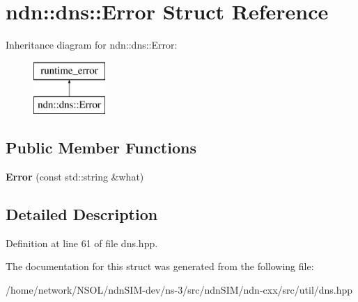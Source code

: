 \hypertarget{structndn_1_1dns_1_1Error}{}\section{ndn\+:\+:dns\+:\+:Error Struct Reference}
\label{structndn_1_1dns_1_1Error}
Inheritance diagram for ndn\+:\+:dns\+:\+:Error\+:\begin{figure}[H]
\begin{center}
\leavevmode
\includegraphics[height=2.000000cm]{structndn_1_1dns_1_1Error}
\end{center}
\end{figure}
\subsection*{Public Member Functions}
\begin{DoxyCompactItemize}
\item 
{\bfseries Error} (const std\+::string \&what)\hypertarget{structndn_1_1dns_1_1Error_a2a69a2063a526a0506529ca2b914d967}{}\label{structndn_1_1dns_1_1Error_a2a69a2063a526a0506529ca2b914d967}

\end{DoxyCompactItemize}


\subsection{Detailed Description}


Definition at line 61 of file dns.\+hpp.



The documentation for this struct was generated from the following file\+:\begin{DoxyCompactItemize}
\item 
/home/network/\+N\+S\+O\+L/ndn\+S\+I\+M-\/dev/ns-\/3/src/ndn\+S\+I\+M/ndn-\/cxx/src/util/dns.\+hpp\end{DoxyCompactItemize}
